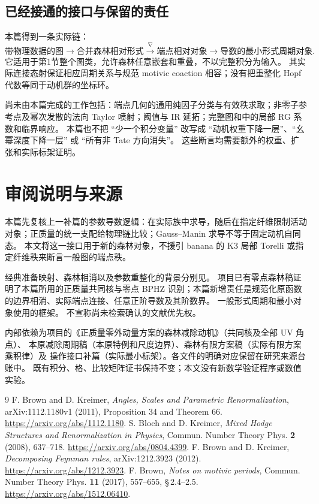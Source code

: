 \documentclass[11pt,a4paper]{ctexart}
\theoremstyle{cnplain}
\theoremstyle{remark}\newtheorem{remark}[theorem]{注}
\begin{document}
\subsection{已经接通的接口与保留的责任}
本篇得到一条实际链：
\[
 \text{带物理数据的图}
 \longrightarrow\text{合并森林相对形式}
 \xrightarrow{\nabla}\text{端点相对对象}
 \longrightarrow\text{导数的最小形式周期对象}.
\]
它适用于第1节整个图类，允许森林任意嵌套和重叠，不以完整积分为输入。
其实际连接态射保证相应周期关系与规范 motivic coaction 相容；没有把重整化 Hopf 代数等同于动机群的坐标环。

尚未由本篇完成的工作包括：端点几何的通用纯因子分类与有效秩求取；非零子参考点及幂次发散的法向 Taylor 喷射；阈值与 IR 延拓；完整图和中的局部 RG 系数和临界响应。
本篇也不把 ``少一个积分变量'' 改写成 ``动机权重下降一层''、``幺幂深度下降一层'' 或 ``所有非 Tate 方向消失''。
这些断言均需要额外的权重、扩张和实际标架证明。

\section*{审阅说明与来源}
本篇先复核上一补篇的参数导数逻辑：在实际族中求导，随后在指定纤维限制活动对象；正质量的统一支配给物理链比较；Gauss--Manin 求导不等于固定动机自同态。
本文将这一接口用于新的森林对象，不援引 banana 的 K3 局部 Torelli 或指定纤维秩来断言一般图的端点秩。

经典准备映射、森林相消以及参数重整化的背景分别见\cite{bk,blochkreimer,decomposing}。
项目已有零点森林稿证明了本篇所用的正质量共同核与零点 BPHZ 识别；本篇新增责任是规范化原函数的边界相消、实际端点连接、任意正阶导数及其阶数界。
一般形式周期和最小对象使用\cite{brown}的框架。
不宣称尚未检索确认的文献优先权。

内部依赖为项目的《正质量零外动量方案的森林减除动机》（共同核及全部 UV 角点）、
本原减除周期稿（本原特例和尺度边界）、森林有限方案稿（实际有限方案乘积律）及
操作接口补篇（实际最小标架）。各文件的明确对应保留在研究来源台账中。
既有积分、格、比较矩阵证书保持不变；本文没有新数学验证程序或数值实验。

\begin{thebibliography}{9}\small
{} F. Brown and D. Kreimer,
\emph{Angles, Scales and Parametric Renormalization},
arXiv:1112.1180v1 (2011), Proposition 34 and Theorem 66.
\url{https://arxiv.org/abs/1112.1180}.
 S. Bloch and D. Kreimer,
\emph{Mixed Hodge Structures and Renormalization in Physics},
Commun. Number Theory Phys. \textbf{2} (2008), 637--718.
\url{https://arxiv.org/abs/0804.4399}.
 F. Brown and D. Kreimer,
\emph{Decomposing Feynman rules}, arXiv:1212.3923 (2012).
\url{https://arxiv.org/abs/1212.3923}.
 F. Brown, \emph{Notes on motivic periods},
Commun. Number Theory Phys. \textbf{11} (2017), 557--655,
\S\,2.4--2.5. \url{https://arxiv.org/abs/1512.06410}.
\end{thebibliography}
\end{document}
